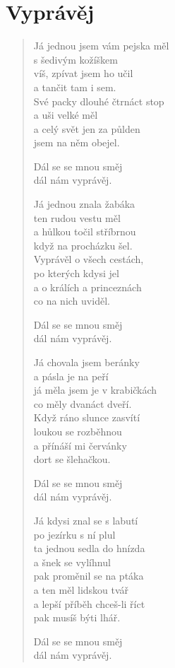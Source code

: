 \section*{Vyprávěj}

\begin{verse}
Já jednou jsem vám pejska měl \\
s šedivým kožíškem \\
víš, zpívat jsem ho učil \\
a tančit tam i sem.\\
Své packy dlouhé čtrnáct stop\\
a uši velké měl\\
a celý svět jen za půlden\\
jsem na něm obejel.

Dál se se mnou směj\\
dál nám vyprávěj.

Já jednou znala žabáka\\
ten rudou vestu měl\\
a hůlkou točil stříbrnou\\
když na procházku šel.\\
Vyprávěl o všech cestách,\\
po kterých kdysi jel\\
a o králích a princeznách\\
co na nich uviděl.

Dál se se mnou směj\\
dál nám vyprávěj.

Já chovala jsem beránky\\
a pásla je na peří\\
já měla jsem je v krabičkách\\
co měly dvanáct dveří.\\
Když ráno slunce zasvítí\\
loukou se rozběhnou\\
a přínáší mi červánky\\
dort se šlehačkou.

Dál se se mnou směj\\
dál nám vyprávěj.

Já kdysi znal se s labutí\\
po jezírku s ní plul\\
ta jednou sedla do hnízda\\
a šnek se vylíhnul\\
pak proměnil se na ptáka\\
a ten měl lidskou tvář\\
a lepší příběh chceš-li říct\\
pak musíš býti lhář.

Dál se se mnou směj\\
dál nám vyprávěj.

\end{verse}
